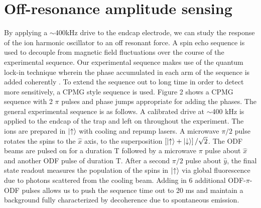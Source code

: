 \documentclass[aps,prl,twocolumn,groupedaddress,floatfix]{revtex4-1}
\begin{document}
\section{Off-resonance amplitude sensing}
By applying a $\sim$400kHz drive to the endcap electrode, we can study the response of the ion harmonic oscillator to an off resonant force. A spin echo sequence is used to decouple from magnetic field fluctuations over the course of the experimental sequence. Our experimental sequence makes use of the quantum lock-in technique wherein the phase accumulated in each arm of the sequence is added coherently \citep{Kotler2011}. To extend the sequence out to long time in order to detect more sensitively, a CPMG style sequence is used. Figure 2 shows a CPMG sequence with 2 $\pi$ pulses and phase jumps appropriate for adding the phases. The general experimental sequence is as follows. A calibrated drive at $\sim$400 kHz is applied to the endcap of the trap and left on throughout the experiment. The ions are prepared in $\ket{\uparrow}$ with cooling and repump lasers. A microwave $\pi/2$ pulse rotates the spins to the $\hat{x}$ axis, to the superposition $\left[\ket{\uparrow} + \ket{\downarrow}\right]/\sqrt{2}$. The ODF beams are pulsed on for a duration T followed by a microwave $\pi$ pulse about $\hat{x}$ and another ODF pulse of duration T. After a second $\pi/2$ pulse about $\hat{y}$, the final state readout measures the population of the spins in $\ket{\uparrow}$ via global fluorescence due to photons scattered from the cooling beam. Adding in 6 additional ODF-$\pi$-ODF pulses allows us to push the sequence time out to 20 ms and maintain a background fully characterized by decoherence due to spontaneous emission.
\end{document}
